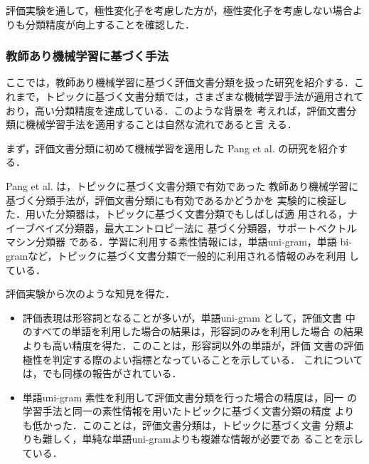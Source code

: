 評価実験を通して，極性変化子を考慮した方が，極性変化子を考慮しない場合よ
りも分類精度が向上することを確認した．

\subsubsection{教師あり機械学習に基づく手法}
\label{sec:dc_ml}

ここでは，教師あり機械学習に基づく評価文書分類を扱った研究を紹介する．こ
れまで，トピックに基づく文書分類では，さまざまな機械学習手法が適用されて
おり，高い分類精度を達成している\cite{sebastiani2002a}．このような背景を
考えれば，評価文書分類に機械学習手法を適用することは自然な流れであると言
える．

まず，評価文書分類に初めて機械学習を適用した Pang et
al. \cite{pang2002a}の研究を紹介する．

\vspace{1em}
\underline{\textbf{\cite{pang2002a}}}
\vspace{1em}

Pang et al. \cite{pang2002a} は，トピックに基づく文書分類で有効であった
教師あり機械学習に基づく分類手法が，評価文書分類にも有効であるかどうかを
実験的に検証した．用いた分類器は，トピックに基づく文書分類でもしばしば適
用される，ナイーブベイズ分類器\cite{mitchell1997a}，最大エントロピー法に
基づく分類器\cite{berger1996a}，サポートベクトルマシン分類器
\cite{vapnik1995a}である．学習に利用する素性情報には，単語uni-gram，単語
bi-gramなど，トピックに基づく文書分類で一般的に利用される情報のみを利用
している．

評価実験から次のような知見を得た．

\begin{itemize}
 \item 評価表現は形容詞となることが多いが，単語uni-gram として，評価文書
       中のすべての単語を利用した場合の結果は，形容詞のみを利用した場合
       の結果よりも高い精度を得た．このことは，形容詞以外の単語が，評価
       文書の評価極性を判定する際のよい指標となっていることを示している．
       これについては，\cite{salvetti2004a}でも同様の報告がされている．

 \item 単語uni-gram 素性を利用して評価文書分類を行った場合の精度は，同一
       の学習手法と同一の素性情報を用いたトピックに基づく文書分類の精度
       よりも低かった．このことは，評価文書分類は，トピックに基づく文書
       分類よりも難しく，単純な単語uni-gramよりも複雑な情報が必要であ
       ることを示している．
\end{itemize}

